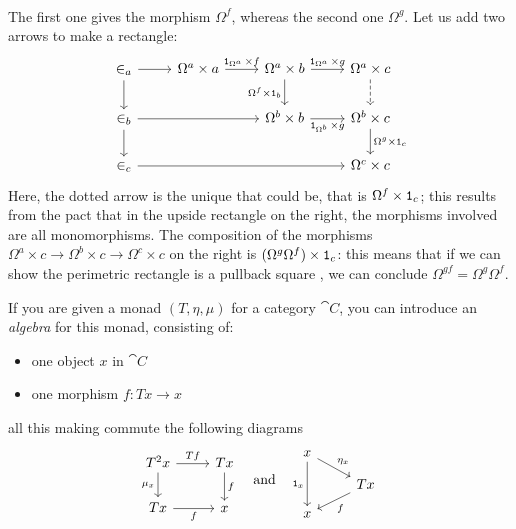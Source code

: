 \begin{sandbox}
\[\begin{tikzcd}
\end{tikzcd}\]
The first one gives the morphism \(\Omega^f\), whereas the second one \(\Omega^g\). Let us add two arrows to make a rectangle:
\[\begin{tikzcd}
\in_a \ar[r] \ar[d] & \Omega^a \times a \ar["{\id_{\Omega^a} \times f}", r] & \Omega^a \times b \ar["{\Omega^f \times \id_b}", d, swap] \ar["{\id_{\Omega^a} \times g}", r] & \Omega^a \times c \ar[d, dashed] \\
\in_b \ar[d] \ar[rr] & & \Omega^b \times b \ar["{\id_{\Omega^b} \times g}", r, swap] & \Omega^b \times c \ar["{\Omega^g \times \id_c}", d] \\
\in_c \ar[rrr] & & & \Omega^c \times c
\end{tikzcd}\]
Here, the dotted arrow is the unique that could be, that is \(\Omega^f \times \operatorname{\mathtt 1}_c\); this results from the pact that in the upside rectangle on the right, the morphisms involved are all monomorphisms. The composition of the morphisms \(\Omega^a \times c \to \Omega^b \times c \to \Omega^c \times c\) on the right is \((\Omega^g \Omega^f) \times \operatorname{\mathtt 1}_c\): this means that if we can show the perimetric rectangle is a pullback square , we can conclude \(\Omega^{gf} = \Omega^g \Omega^f\).  
\end{sandbox}


If you are given a monad \((T, \eta, \mu)\) for a category \(\cat C\), you can introduce an {\em algebra} for this monad, consisting of:
\begin{itemize}
\item one object \(x\) in \(\cat C\)
\item one morphism \(f : T x \to x\)
\end{itemize}
all this making commute the following diagrams
\[\begin{tikzcd}
T^2 x \ar["Tf", r] \ar["{\mu_x}", d, swap] & Tx \ar["f", d] \\
T x \ar["f", r, swap] & x
\end{tikzcd} \quad\text{and}\quad \begin{tikzcd}[row sep=small]
x \ar["{\id_x}", dd, swap] \ar["{\eta_x}", dr] \\
& Tx \ar["f", dl] \\
x %
\end{tikzcd}\]


